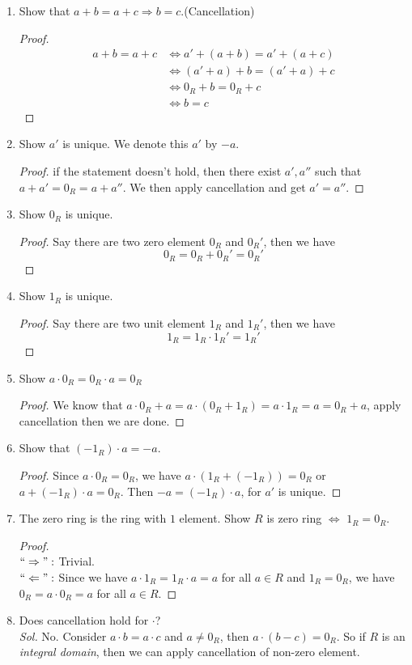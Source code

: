 \begin{exercise}\mbox{}
\begin{enumerate}
\item Show that $a+b=a+c\Rightarrow b=c.$(Cancellation)
\begin{proof}
\begin{align*}
a+b=a+c &\Leftrightarrow a'+ (a+b) = a' + (a+c)\\
&\Leftrightarrow (a'+a) +b = (a'+a) +c\\
&\Leftrightarrow 0_R+b =0_R +c\\
&\Leftrightarrow b=c
\end{align*}
\end{proof}
\item Show $a'$ is unique. We denote this $a'$ by $-a$.
\begin{proof}
if the statement doesn't hold, then there exist $a',a''$ such that $a+a' =0_R=a+a''$. We then apply cancellation and get $a'=a''$.
\end{proof}
\item Show $0_R$ is unique.
\begin{proof}
Say there are two zero element $0_R$ and $0_R'$, then we have
$$0_R =0_R+0_R' = 0_R'$$
\end{proof}
\item Show $1_R$ is unique.
\begin{proof}
Say there are two unit element $1_R$ and $1_R'$, then we have
$$1_R = 1_R\cdot 1_R' =1_R'$$
\end{proof}
\item Show $a\cdot 0_R =0_R \cdot a = 0_R$
\begin{proof}
We know that $a\cdot 0_R +a=a\cdot (0_R+1_R) =a\cdot 1_R =a = 0_R+a$, apply cancellation then we are done.
\end{proof}
\item Show that $(-1_R)\cdot a =-a$.
\begin{proof}
Since $a\cdot 0_R = 0_R$, we have $a\cdot(1_R+(-1_R)) =0_R$ or $a+ (-1_R)\cdot a = 0_R$. Then $-a=(-1_R)\cdot a$, for $a'$ is unique.
\end{proof}
\item The zero ring is the ring with $1$ element. Show $R$ is zero ring $\Leftrightarrow$ $1_R = 0_R$.
\begin{proof}\mbox{}\\
$``\Rightarrow":$ Trivial.\\
$``\Leftarrow":$ Since we have $a\cdot 1_R =1_R\cdot a =a$ for all $a\in R$ and $1_R=0_R$, we have $0_R = a\cdot 0_R= a$ for all $a\in R$.
\end{proof}
\item Does cancellation hold for $\cdot$\;?\\
\textit{Sol.} No. Consider $a\cdot b = a\cdot c$ and $a\neq 0_R$, then $a\cdot(b-c)=0_R$. So if $R$ is an \emph{integral domain}, then we can apply cancellation of non-zero element.
\end{enumerate}
\end{exercise}
